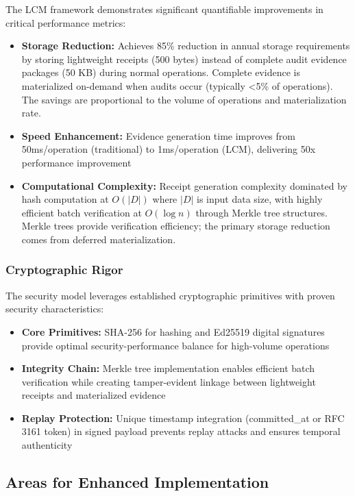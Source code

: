 \documentclass[12pt,a4paper]{article}
\begin{document}
The LCM framework demonstrates significant quantifiable improvements in critical performance metrics:

\begin{itemize}
\item \textbf{Storage Reduction:} Achieves 85\% reduction in annual storage requirements by storing lightweight receipts (500 bytes) instead of complete audit evidence packages (50 KB) during normal operations. Complete evidence is materialized on-demand when audits occur (typically <5\% of operations). The savings are proportional to the volume of operations and materialization rate.
\item \textbf{Speed Enhancement:} Evidence generation time improves from 50ms/operation (traditional) to 1ms/operation (LCM), delivering 50x performance improvement
\item \textbf{Computational Complexity:} Receipt generation complexity dominated by hash computation at $O(|D|)$ where $|D|$ is input data size, with highly efficient batch verification at $O(\log n)$ through Merkle tree structures. Merkle trees provide verification efficiency; the primary storage reduction comes from deferred materialization.
\end{itemize}

\subsubsection{Cryptographic Rigor}

The security model leverages established cryptographic primitives with proven security characteristics:

\begin{itemize}
\item \textbf{Core Primitives:} SHA-256 for hashing and Ed25519 digital signatures provide optimal security-performance balance for high-volume operations
\item \textbf{Integrity Chain:} Merkle tree implementation enables efficient batch verification while creating tamper-evident linkage between lightweight receipts and materialized evidence
\item \textbf{Replay Protection:} Unique timestamp integration (committed\_at or RFC 3161 token) in signed payload prevents replay attacks and ensures temporal authenticity
\end{itemize}

\subsection{Areas for Enhanced Implementation}
\end{document}
